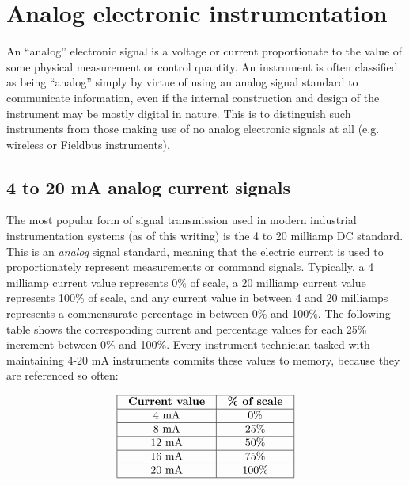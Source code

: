 \chapter{Analog electronic instrumentation}

An ``analog'' electronic signal is a voltage or current proportionate to the value of some physical measurement or control quantity.  An instrument is often classified as being ``analog'' simply by virtue of using an analog signal standard to communicate information, even if the internal construction and design of the instrument may be mostly digital in nature.  This is to distinguish such instruments from those making use of no analog electronic signals at all (e.g. wireless or Fieldbus instruments).

\section{4 to 20 mA analog current signals}

The most popular form of signal transmission used in modern industrial instrumentation systems (as of this writing) is the 4 to 20 milliamp DC standard.  This is an \textit{analog} signal standard, meaning that the electric current is used to proportionately represent measurements or command signals.  Typically, a 4 milliamp current value represents 0\% of scale, a 20 milliamp current value represents 100\% of scale, and any current value in between 4 and 20 milliamps represents a commensurate percentage in between 0\% and 100\%.  The following table shows the corresponding current and percentage values for each 25\% increment between 0\% and 100\%.  Every instrument technician tasked with maintaining 4-20 mA instruments commits these values to memory, because they are referenced so often: 


$$\vbox{\offinterlineskip
\halign{\strut
\vrule \quad\hfil # \ \hfil & 
\vrule \quad\hfil # \ \hfil \vrule \cr
\noalign{\hrule}
%
\textbf{Current value} & \textbf{\% of scale} \cr
%
\noalign{\hrule}
%
4 mA & 0\% \cr
%
\noalign{\hrule}
%
8 mA & 25\% \cr
%
\noalign{\hrule}
%
12 mA & 50\% \cr
%
\noalign{\hrule}
%
16 mA & 75\% \cr
%
\noalign{\hrule}
%
20 mA & 100\% \cr
%
\noalign{\hrule}
} %
}$$ %


